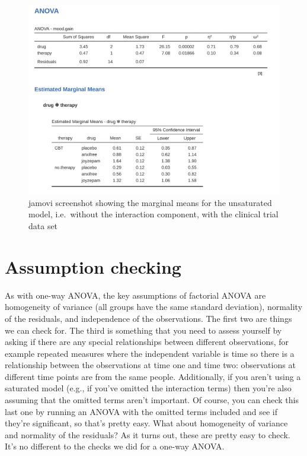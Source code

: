 \documentclass[
  a4paper,
]{book}
\begin{document}
\begin{figure}

\includegraphics[width=1\textwidth,height=\textheight]{images/fig14-9.png} \hfill{}

\caption{\label{fig-fig14-9}jamovi screenshot showing the marginal means
for the unsaturated model, i.e.~without the interaction component, with
the clinical trial data set}

\end{figure}

\hypertarget{assumption-checking}{%
\section{Assumption checking}\label{assumption-checking}}

As with one-way ANOVA, the key assumptions of factorial ANOVA are
homogeneity of variance (all groups have the same standard deviation),
normality of the residuals, and independence of the observations. The
first two are things we can check for. The third is something that you
need to assess yourself by asking if there are any special relationships
between different observations, for example repeated measures where the
independent variable is time so there is a relationship between the
observations at time one and time two: observations at different time
points are from the same people. Additionally, if you aren't using a
saturated model (e.g., if you've omitted the interaction terms) then
you're also assuming that the omitted terms aren't important. Of course,
you can check this last one by running an ANOVA with the omitted terms
included and see if they're significant, so that's pretty easy. What
about homogeneity of variance and normality of the residuals? As it
turns out, these are pretty easy to check. It's no different to the
checks we did for a one-way ANOVA.
\end{document}
